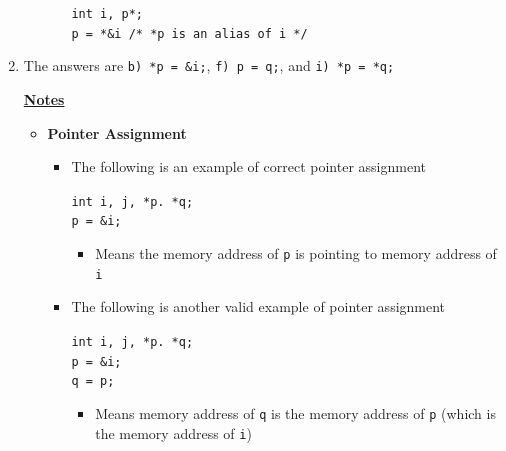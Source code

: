 \documentclass[12pt]{article}
\begin{document}
\begin{enumerate}[1.]
\begin{itemize}
\begin{itemize}
            \texttt{int i, p*;\\
            p = *\&i /* *p is an alias of i */}
        \end{itemize}
    \end{itemize}

    \item

    \bigskip

    The answers are \texttt{b) *p = \&i;}, \texttt{f) p = q;}, and \texttt{i) *p = *q;}

    \bigskip

    \underline{\textbf{Notes}}

    \begin{itemize}
        \item \textbf{Pointer Assignment}

        \begin{itemize}
            \item The following is an example of correct pointer assignment

            \bigskip

            \texttt{int i, j, *p. *q;\\
            p = \&i;
            }

            \bigskip

            \begin{itemize}
                \item Means the memory address of \texttt{p} is pointing to memory address of \texttt{i}
            \end{itemize}

            \bigskip

            \item The following is another valid example of pointer assignment

            \bigskip

            \texttt{int i, j, *p. *q;\\
            p = \&i;\\
            q = p;
            }

            \bigskip

            \begin{itemize}
                \item Means memory address of \texttt{q} is the memory address of \texttt{p} (which is the memory address of \texttt{i})
            \end{itemize}


\end{itemize}
\end{itemize}
\end{enumerate}
\end{document}
